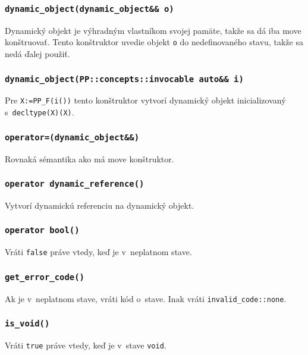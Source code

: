 \subsubsection{\texttt{dynamic\_object(dynamic\_object\&\& o)}}

Dynamický objekt je výhradným vlastníkom svojej pamäte, takže sa dá iba move konštruovať. Tento konštruktor uvedie objekt \texttt{o} do nedefinovaného stavu, takže sa nedá ďalej použiť.

\subsubsection{\texttt{dynamic\_object(PP::concepts::invocable auto\&\& i)}}

Pre \texttt{X:=PP\_F(i())} tento konštruktor vytvorí dynamický objekt inicializovaný s~\texttt{decltype(X)(X)}.

\subsubsection{\texttt{operator=(dynamic\_object\&\&)}}

Rovnaká sémantika ako má move konštruktor.

\subsubsection{\texttt{operator dynamic\_reference()}}

Vytvorí dynamickú referenciu na dynamický objekt.

\subsubsection{\texttt{operator bool()}}

Vráti \texttt{false} práve vtedy, keď je v~neplatnom stave.

\subsubsection{\texttt{get\_error\_code()}}

Ak je v~neplatnom stave, vráti kód o~stave. Inak vráti \texttt{invalid\_code::none}.

\subsubsection{\texttt{is\_void()}}

Vráti \texttt{true} práve vtedy, keď je v~stave \texttt{void}.

